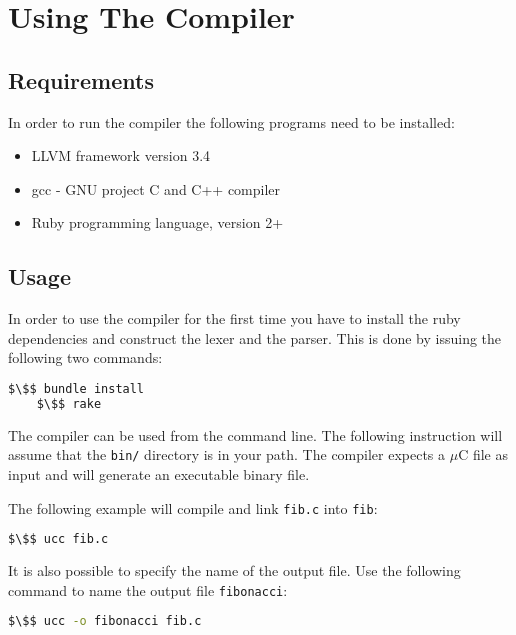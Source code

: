 
\section{Using The Compiler}

\subsection{Requirements}

In order to run the compiler the following programs need to be installed:
\begin{itemize}
  \item LLVM framework version 3.4
  \item gcc - GNU project C and C++ compiler
  \item Ruby programming language, version 2+
\end{itemize}

\subsection{Usage}

In order to use the compiler for the first time you have to install the ruby dependencies and construct the lexer and the parser. This is done by issuing the following two commands:
\begin{lstlisting}[language=bash,numbers=none]
    $\$$ bundle install
    $\$$ rake
\end{lstlisting}

The compiler can be used from the command line. The following instruction will assume that the \texttt{bin/} directory is in your path. The compiler expects a $\mu$C file as input and will generate an executable binary file.

The following example will compile and link \texttt{fib.c} into \texttt{fib}:
\begin{lstlisting}[language=bash,numbers=none]
    $\$$ ucc fib.c
\end{lstlisting}

It is also possible to specify the name of the output file. Use the following command to name the output file \texttt{fibonacci}:
\begin{lstlisting}[language=bash,numbers=none]
    $\$$ ucc -o fibonacci fib.c
\end{lstlisting}

